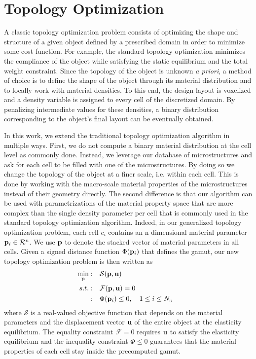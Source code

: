\section{Topology Optimization}
\label{sec:topoOpt}
A classic topology optimization problem consists of optimizing the shape and structure of a given object defined by a prescribed domain in order to minimize some cost function. For example, the standard topology optimization minimizes the compliance of the object while satisfying the static equilibrium and the total weight constraint.
Since the topology of the object is unknown {\it a priori}, a method of choice is to define the shape of the object through its material distribution and to locally work with material densities. To this end, the design layout is voxelized and a density variable is assigned to every cell of the discretized domain. By penalizing intermediate values for these densities, a binary distribution corresponding to the object's final layout can be eventually obtained.

In this work, we extend the traditional topology optimization algorithm in multiple ways.
First, we do not compute a binary material distribution at the cell level as commonly done. 
Instead, we leverage our database of microstructures and ask for each cell to be filled with one of the microstructures.
By doing so we change the topology of the object at a finer scale, i.e. within each cell. This is done by working with the macro-scale material properties of the microstructures instead of their geometry directly. The second difference is that our algorithm can be used with parametrizations of the material property space that are more complex than the single density parameter per cell that is commonly used in the standard topology optimization algorithm. Indeed, in our generalized topology optimization problem, each cell $c_i$ contains an n-dimensional material parameter $\mathbf{p}_i\in \mathcal{R}^n$. We use $\mathbf{p}$ to denote the stacked vector of material parameters in all cells.
Given a signed distance function $\Phi(\mathbf{p}_i)$ that defines the gamut,
our new topology optimization problem is then written as
\begin{equation}
\begin{aligned}
\min_{\mathbf{p}} : \quad & \mathcal{S}(\mathbf{p},\mathbf{u}) & \\
s.t. : \quad & \mathcal{F}(\mathbf{\mathbf{p}},\mathbf{u})=0 & \\
: \quad & \Phi(\mathbf{p}_i)\leq 0,  \quad 1\leq i \leq N_c&	
\label{eq:op}
\end{aligned}
\end{equation}
where $\mathcal{S}$ is a real-valued objective function that depends on the material parameters and the displacement vector $\mathbf{u}$ of the entire object at the elasticity equilibrium.
The equality constraint $\mathcal{F}=0$ requires $\mathbf{u}$ to satisfy the elasticity equilibrium and the inequality constraint $\Phi\leq0$ guarantees that the material properties of each cell stay inside the precomputed gamut.

